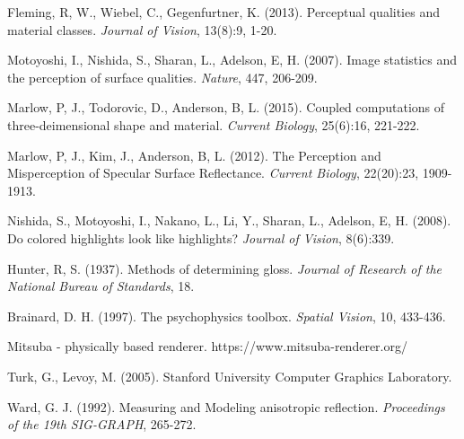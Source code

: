 \begin{thebibliography}{9}%

    Fleming, R, W., Wiebel, C., Gegenfurtner, K. (2013).
    Perceptual qualities and material classes.
    {\it Journal of Vision}, 13(8):9, 1-20.

    Motoyoshi, I., Nishida, S., Sharan, L., Adelson, E, H. (2007).
    Image statistics and the perception of surface qualities.
    {\it Nature}, 447, 206-209.

    Marlow, P, J., Todorovic, D., Anderson, B, L. (2015).
    Coupled computations of three-deimensional shape and material.
    {\it Current Biology}, 25(6):16, 221-222.

    Marlow, P, J., Kim, J., Anderson, B, L. (2012).
    The Perception and Misperception of Specular Surface Reflectance.
    {\it Current Biology}, 22(20):23, 1909-1913.


    Nishida, S., Motoyoshi, I., Nakano, L., Li, Y., Sharan, L., Adelson, E, H. (2008).
    Do colored highlights look like highlights?
    {\it Journal of Vision}, 8(6):339.

    Hunter, R, S. (1937).
    Methods of determining gloss.
    {\it Journal of Research of the National Bureau of Standards}, 18.

    Brainard, D. H. (1997).
    The psychophysics toolbox.
    {\it Spatial Vision}, 10, 433-436.

    Mitsuba - physically based renderer. https://www.mitsuba-renderer.org/

    Turk, G., Levoy, M. (2005).
    Stanford University Computer Graphics Laboratory.

    Ward, G. J. (1992).
    Measuring and Modeling anisotropic reflection.
    {\it Proceedings of the 19th SIG-GRAPH}, 265-272.



\end{thebibliography}
